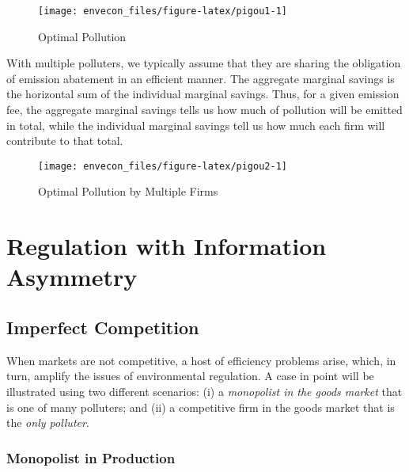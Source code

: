 \documentclass[
]{book}
\begin{document}
\begin{figure}

{\centering \texttt{[image: envecon\_files/figure-latex/pigou1-1]} 

}

\caption{Optimal Pollution}\label{fig:pigou1}
\end{figure}

With multiple polluters, we typically assume that they are sharing the obligation of emission abatement in an efficient manner. The aggregate marginal savings is the horizontal sum of the individual marginal savings. Thus, for a given emission fee, the aggregate marginal savings tells us how much of pollution will be emitted in total, while the individual marginal savings tell us how much each firm will contribute to that total.

\begin{figure}

{\centering \texttt{[image: envecon\_files/figure-latex/pigou2-1]} 

}

\caption{Optimal Pollution by Multiple Firms}\label{fig:pigou2}
\end{figure}

\hypertarget{regulation-with-information-asymmetry}{%
\chapter{Regulation with Information Asymmetry}\label{regulation-with-information-asymmetry}}

\hypertarget{imperfect-competition}{%
\section{Imperfect Competition}\label{imperfect-competition}}

When markets are not competitive, a host of efficiency problems arise, which, in turn, amplify the issues of environmental regulation. A case in point will be illustrated using two different scenarios: (i) a \emph{monopolist in the goods market} that is one of many polluters; and (ii) a competitive firm in the goods market that is the \emph{only polluter}.

\hypertarget{monopolist-in-production}{%
\subsection{Monopolist in Production}\label{monopolist-in-production}}
\end{document}
